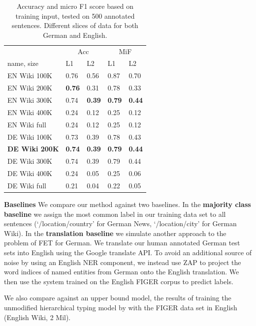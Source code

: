 \documentclass[11pt,a4paper]{article}
\begin{document}
\begin{table}[h!]
\begin{tabular}{l|l|l||l|l}
 &\multicolumn{2}{c}{Acc}&\multicolumn{2}{c}{MiF} \\
name, size  &L1  & L2  &L1    &L2   \\\hline \hline
EN Wiki 100K & 0.76 & 0.56& 0.87  & 0.70 \\
EN Wiki 200K & \textbf{0.76} &0.31& 0.78  &0.33  \\
EN Wiki 300K & 0.74 & \textbf{0.39}&\textbf{0.79 }&  \textbf{0.44}\\ 
EN Wiki 400K &0.24 & 0.12& 0.25  & 0.12\\
EN Wiki full &0.24 & 0.12& 0.25  & 0.12\\
\hline
DE Wiki 100K & 0.73 &0.39& 0.78  &0.43\\
\textbf{DE Wiki 200K} & \textbf{0.74} & \textbf{0.39}& \textbf{0.79} &\textbf{0.44}\\
DE Wiki 300K & 0.74 & 0.39& 0.79  & 0.44 \\
DE Wiki 400K &0.24 & 0.05 & 0.25  & 0.06\\
DE Wiki full &0.21 & 0.04 & 0.22  & 0.05
\end{tabular}
\caption{Accuracy and micro F1 score based on training input, tested on 500 annotated sentences. Different slices of data for both German and English.}
\label{table:results2}
\end{table}

\textbf{Baselines} 
We compare our method against two baselines. In the \textbf{majority class baseline} we assign the most common label in our training data set to all sentences (`/location/country' for German News, `/location/city' for German Wiki). In the \textbf{translation baseline} we simulate another approach to the problem of FET for German. We translate our human annotated German test sets into English using the Google translate API. To avoid an additional source of noise by using an English NER component, we instead use ZAP to project the word indices of named entities from German onto the English translation. We then use the system trained on the English FIGER corpus to predict labels.

We also compare against an upper bound model, the results of training the unmodified hierarchical typing model by \citet{ChenCD20} with the FIGER data set in English (English Wiki, 2 Mil).
\end{document}
